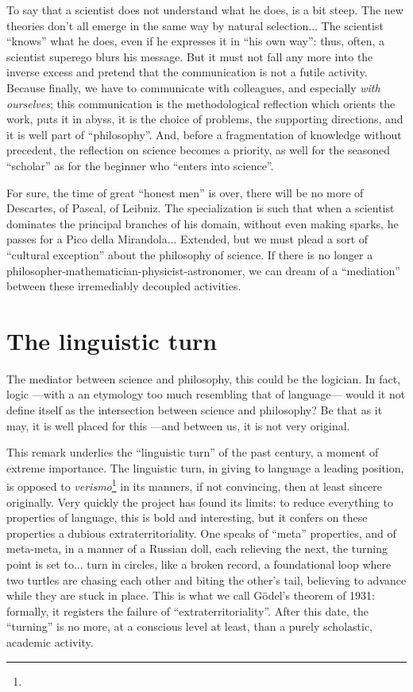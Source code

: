 \documentclass{article}
\begin{document}
To say that a scientist does not understand what he does, is a bit steep. The new theories don't all emerge in the same way by natural selection... The scientist \enquote{knows} what he does, even if he expresses it in \enquote{his own way}: thus, often, a scientist superego blurs his message. But it must not fall any more into the inverse excess and pretend that the communication is not a futile activity. Because finally, we have to communicate with colleagues, and especially \emph{with ourselves}; this communication is the methodological reflection which orients the work, puts it in abyss, it is the choice of problems, the supporting directions, and it is well part of \enquote{philosophy}. And, before a fragmentation of knowledge without precedent, the reflection on science becomes a priority, as well for the seasoned \enquote{scholar} as for the beginner who \enquote{enters into science}.

For sure, the time of great \enquote{honest men} is over, there will be no more of Descartes, of Pascal, of Leibniz. The specialization is such that when a scientist dominates the principal branches of his domain, without even making sparks, he passes for a Pico della Mirandola... Extended, but we must plead a sort of \enquote{cultural exception} about the philosophy of science. If there is no longer a philosopher-mathematician-physicist-astronomer, we can dream of a \enquote{mediation} between these irremediably decoupled activities.

\section{The linguistic turn}
The mediator between science and philosophy, this could be the logician. In fact, logic ---with a an etymology too much resembling that of language--- would it not define itself as the intersection between science and philosophy? Be that as it may, it is well placed for this ---and between us, it is not very original.

This remark underlies the \enquote{linguistic turn} of the past century, a moment of extreme importance. The linguistic turn, in giving to language a leading position, is opposed to \emph{verismo}\footnote{} in its manners, if not convincing, then at least sincere originally. Very quickly the project has found its limits: to reduce everything to properties of language, this is bold and interesting, but it confers on these properties a dubious extraterritoriality. One speaks of \enquote{meta} properties, and of meta-meta, in a manner of a Russian doll, each relieving the next, the turning point is set to... turn in circles, like a broken record, a foundational loop where two turtles are chasing each other and biting the other's tail, believing to advance while they are stuck in place. This is what we call Gödel's theorem of 1931: formally, it registers the failure of \enquote{extraterritoriality}. After this date, the \enquote{turning} is no more, at a conscious level at least, than a purely scholastic, academic activity.
\end{document}
